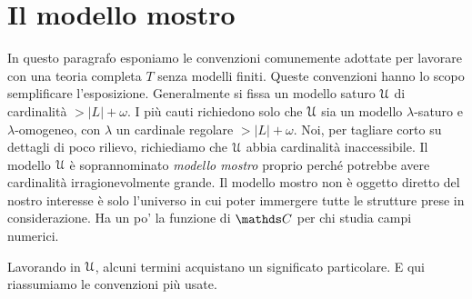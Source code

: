 \section{Il modello mostro}\label{mostro}

\label{compattezzasaturazione}


In questo paragrafo esponiamo le convenzioni comunemente adottate per lavorare con una teoria completa $T$ senza modelli finiti. Queste convenzioni hanno lo scopo semplificare l'esposizione. Generalmente si fissa un modello saturo $\EuScript U$ di cardinalit\`a $>|L|+\omega$. I pi\`u cauti richiedono solo che $\EuScript U$ sia un modello $\lambda$-saturo e $\lambda$-omogeneo, con $\lambda$ un cardinale regolare $>|L|+\omega$. Noi, per tagliare corto su dettagli di poco rilievo, richiediamo che $\EuScript U$ abbia cardinalit\`a inaccessibile. Il modello $\EuScript U$ \`e soprannominato \emph{modello mostro\/} proprio perch\'e potrebbe avere cardinalit\`a irragionevolmente grande. Il modello mostro non \`e oggetto diretto del nostro interesse \`e solo l'universo in cui poter immergere tutte le strutture prese in considerazione. Ha un po' la funzione di $\CC$ per chi studia campi numerici.


\newcommand{\labellalunga}[1]{#1\hfill}
\newenvironment{litemize}[1]
   {\begin{list}{}{
   \setlength{\parskip}{0mm}
   \setlength{\topsep}{5mm}
   \setlength{\partopsep}{0mm}
   \setlength{\rightmargin}{0mm}
   \setlength{\listparindent}{0mm}
   \setlength{\itemindent}{0mm}
   \setlength{\itemsep}{3mm}
   \settowidth{\labelwidth}{#1}
   \setlength{\parsep}{0mm}
   \setlength{\partopsep}{0mm}
   \setlength{\labelsep}{3mm}
   \setlength{\leftmargin}{\labelwidth+\labelsep}
   \let\makelabel\labellalunga}}{
   \end{list}}

Lavorando in $\EuScript U$, alcuni termini acquistano un significato particolare. E qui riassumiamo le convenzioni pi\`u usate.

